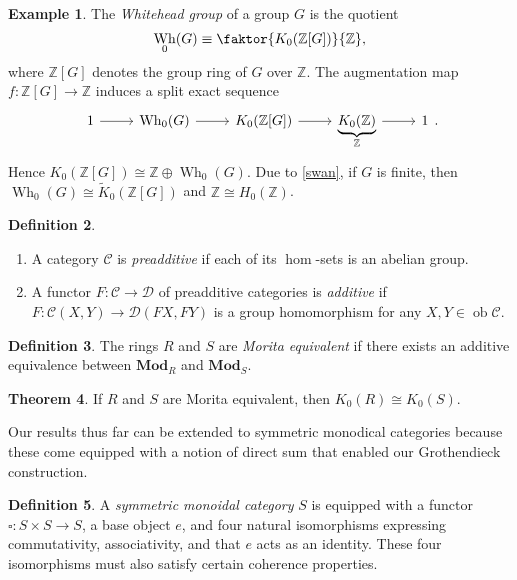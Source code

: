\documentclass[10pt,letterpaper,cm]{nupset}
\theoremstyle{definition}
\newtheorem{definition}{Definition}[section]
\newtheorem{exmp}[definition]{Example}
\theoremstyle{theorem}
\newtheorem{theorem}[definition]{Theorem}
\theoremstyle{remark}
\newcommand{\Z}{\mathbb Z}
\newcommand{\1}{\mathbf{1}}
\renewcommand{\c}{\mathscr{C}}
\renewcommand{\d}{\mathscr{D}}
\newcommand{\0}{\vec 0}
\DeclareMathOperator{\ob}{ob}
\DeclareMathOperator{\wh}{Wh}
\begin{document}
\begin{exmp}
The \textit{Whitehead group} of a group $G$ is the quotient $$\wh_0(G) \equiv \faktor{K_0(\Z[G])}{\Z},$$ where $\Z[G]$ denotes the group ring of $G$ over $\Z$. The augmentation map $f: \Z[G] \to \Z$ induces a split exact sequence 
\[
\begin{tikzcd}
1 \arrow[r] & \wh_0(G) \arrow[r] & K_0(\Z[G]) \arrow[r] & \underbrace{K_0(\Z)}_{\Z} \arrow[r] & 1
\end{tikzcd}.
\]
 Hence $K_0(\Z[G]) \cong \Z \oplus \wh_0(G)$. Due to \cref{swan}, if $G$ is finite, then $\wh_0(G) \cong \widetilde{K}_0(\Z[G])$  and $\Z \cong H_0(\Z)$. 
\end{exmp}

\smallskip

\begin{definition} $ $
\begin{enumerate}
\item A category $\c$ is \textit{preadditive} if each of its $\hom$-sets is an abelian group.
\item A functor $F: \c \to \d$ of preadditive categories is \textit{additive} if $F: \c(X, Y) \to \d(FX, FY)$ is a group homomorphism for any $X, Y \in \ob \c$.
\end{enumerate}
\end{definition}

\begin{definition}
The rings $R$ and $S$ are \textit{Morita equivalent} if there exists an additive equivalence between $\mathbf{Mod}_R$ and $\mathbf{Mod}_S$. 
\end{definition}

\begin{theorem}
If $R$ and $S$ are Morita equivalent, then $K_0(R) \cong K_0(S)$.
\end{theorem}

\bigskip



Our results thus far can be extended to symmetric monodical categories because these come equipped with a notion of direct sum that enabled our Grothendieck construction. 

\begin{definition}
A \textit{symmetric monoidal category} $S$ is equipped with a functor $\square : S \times S \to S$, a base object $e$, and four natural isomorphisms expressing commutativity, associativity, and that $e$ acts as an identity. These four isomorphisms must also satisfy certain coherence properties.
\end{definition}
\end{document}
